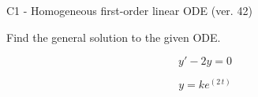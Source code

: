 \begin{exercise}
  \begin{exerciseTitle}C1 - Homogeneous first-order linear ODE (ver. 42)\end{exerciseTitle}
  \begin{exerciseStatement}
    
Find the general solution to the given ODE.

    
\[y'-2y=0\]

  \end{exerciseStatement}
  \begin{exerciseAnswer}
    
\[y= k e^{\left(2 \, t\right)}\]

  \end{exerciseAnswer}
\end{exercise}